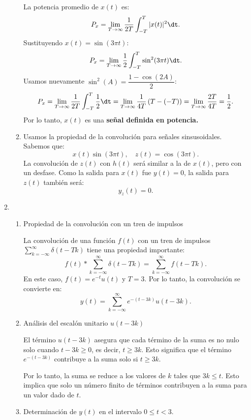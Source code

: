 \begin{enumerate}[label=\color{red}\textbf{\arabic*)}]
\begin{enumerate}[label=\color{red}\textbf{\alph*)}]
        La potencia promedio de $x(t)$ es:  \[
        P_x=\lim_{T \to \infty} \dfrac{1}{2T}\int_{-T}^{T} |x(t)|^2\dt. 
        \] 
        Sustituyendo $x(t)=\sin(3\pi t)$: \[
        P_x=\lim_{T \to \infty} \dfrac{1}{2}\int_{-T}^{T} \sin^2(3\pi t)\dt. 
        \] 
        Usamos nuevamente $\sin^2(A)=\dfrac{1-\cos(2A)}{2}$: \[
        P_x=\lim_{T \to \infty} \dfrac{1}{2T}\int_{-T}^{T} \dfrac{1}{2}\dt=\lim_{T \to \infty} \dfrac{1}{4T} \left( T-(-T) \right) =\lim_{T \to \infty} \dfrac{2T}{4T}=\dfrac{1}{2}.
        \] 
        Por lo tanto, $x(t)$ es una  \textbf{señal definida en potencia.} 
    \item {}

        Usamos la propiedad de la convolución para señales sinsusoidales. Sabemos que: \[
        x(t)\sin(3\pi t),\quad z(t)=\cos(3\pi t).
        \] 
        La convolución de $z(t)$ con  $h(t)$ será similar a la de  $x(t)$, pero con un desfase. Como la salida para  $x(t)$ fue  $y(t)=0$, la salida para  $z(t)$ también será:  \[
        y_z(t)=0.
        \] 
\end{enumerate}
\item {} 

\begin{enumerate}[label=Paso \arabic*:]
    \item Propiedad de la convolución con un tren de impulsos

        La convolución de una función $f(t)$ con un tren de impulsos  $\sum_{k=-\infty}^{\infty} \delta(t-Tk)$ tiene una propiedad importante: \[
        f(t)\ast \sum_{k=-\infty}^{\infty} \delta(t-Tk)=\sum_{k=-\infty}^{\infty} f(t-Tk).
        \] 
        En este caso, $f(t)=e^{-t}u(t) $ y $T=3$. Por lo tanto, la convolución se convierte en:  \[
        y(t)=\sum_{k=-\infty}^{\infty} e^{-(t-3k)}u(t-3k). 
        \] 
    \item Análisis del escalón unitario $u(t-3k)$

        El término  $u(t-3k)$ asegura que cada término de la suma es no nulo solo cuando  $t-3k\ge 0$, es decir, $t\ge 3k$. Esto significa que el término $e^{-(t-3k)} $ contribuye a la suma solo si $t\ge 3k$.

        Por lo tanto, la suma se reduce a los valores de $k$ tales que $3k\le t$. Esto implica que solo un número finito de términos contribuyen a la suma para un valor dado de $t$.
    \item Determinación de  $y(t)$ en el intervalo  $0\le t<3$.


\end{enumerate}
\end{enumerate}
